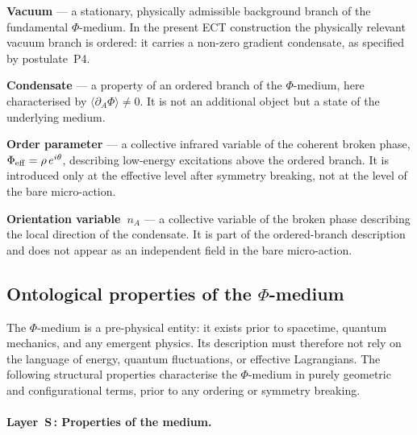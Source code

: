 \documentclass[11pt,a4paper]{article}
\numberwithin{equation}{section}
\begin{document}
\medskip
\noindent\textbf{Vacuum} --- a stationary, physically admissible
background branch of the fundamental $\Phi$-medium.
In the present ECT construction the physically relevant vacuum branch
is ordered: it carries a non-zero gradient condensate, as specified
by postulate~P4.

\medskip
\noindent\textbf{Condensate} --- a property of an ordered branch of
the $\Phi$-medium, here characterised by
$\langle\partial_A\Phi\rangle \neq 0$.
It is not an additional object but a state of the underlying medium.

\medskip
\noindent\textbf{Order parameter} --- a collective infrared variable
of the coherent broken phase,
$\Phi_{\rm eff} = \rho\,e^{i\theta}$,
describing low-energy excitations above the ordered branch.
It is introduced only at the effective level after symmetry breaking,
not at the level of the bare micro-action.

\medskip
\noindent\textbf{Orientation variable~$n_A$} --- a collective variable
of the broken phase describing the local direction of the condensate.
It is part of the ordered-branch description and does not appear as an
independent field in the bare micro-action.


\subsection{Ontological properties of the \texorpdfstring{$\Phi$}{Phi}-medium}
\label{subsec:phi_medium_properties}

The $\Phi$-medium is a pre-physical entity: it exists prior to
spacetime, quantum mechanics, and any emergent physics.
Its description must therefore not rely on the language of energy,
quantum fluctuations, or effective Lagrangians.
The following structural properties characterise the $\Phi$-medium
in purely geometric and configurational terms, prior to any ordering
or symmetry breaking.

\paragraph{Layer~S\,: Properties of the medium.}
\end{document}
